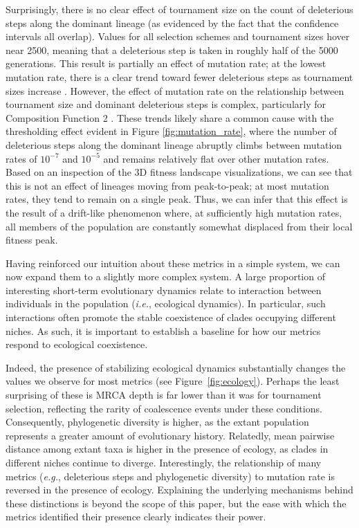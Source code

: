 \documentclass[letterpaper]{article}
\begin{document}
Surprisingly, there is no clear effect of tournament size on the count of deleterious steps along the dominant lineage (as evidenced by the fact that the confidence intervals all overlap). Values for all selection schemes and tournament sizes hover near 2500, meaning that a deleterious step is taken in roughly half of the 5000 generations. This result is partially an effect of mutation rate; at the lowest mutation rate, there is a clear trend toward fewer deleterious steps as tournament sizes increase \citep{supplement}. However, the effect of mutation rate on the relationship between tournament size and dominant deleterious steps is complex, particularly for Composition Function 2 \citep{supplement}. These trends likely share a common cause with the thresholding effect evident in Figure \ref{fig:mutation_rate}, where the number of deleterious steps along the dominant lineage abruptly climbs between mutation rates of %
$10^{-7}$ and $10^{-5}$
and remains relatively flat over other mutation rates. Based on an inspection of the %
3D fitness landscape visualizations, we can see that this is not an effect of lineages moving from peak-to-peak; at most mutation rates, they tend to remain on a single peak. Thus, we can infer that this effect is the result of a drift-like phenomenon where, at sufficiently high mutation rates, all members of the population are constantly somewhat displaced from their local fitness peak.

Having %
reinforced our intuition about these metrics 
in a simple system, we can now expand them to a slightly more complex system. A large proportion of interesting short-term evolutionary dynamics relate to interaction between individuals in the population (\textit{i.e.}, ecological dynamics). In particular, such interactions often promote the stable coexistence of clades occupying different niches. As such, it is important to establish a baseline for how our metrics respond to ecological coexistence. 

Indeed, the presence of stabilizing ecological dynamics substantially changes the values we observe for most metrics (see Figure~\ref{fig:ecology}). Perhaps the least surprising of these is MRCA depth is far lower than it was for tournament selection, reflecting the rarity of coalescence events under these conditions. Consequently, phylogenetic diversity is higher, as the extant population represents a greater amount of evolutionary history. Relatedly, mean pairwise distance among extant taxa is higher in the presence of ecology, as clades in different niches continue to diverge. Interestingly, the relationship of many metrics (\textit{e.g.}, deleterious steps and phylogenetic diversity) to mutation rate is reversed in the presence of ecology. Explaining the underlying mechanisms behind these distinctions is beyond the scope of this paper, but the ease with which the metrics identified their presence clearly indicates their power.
\end{document}
